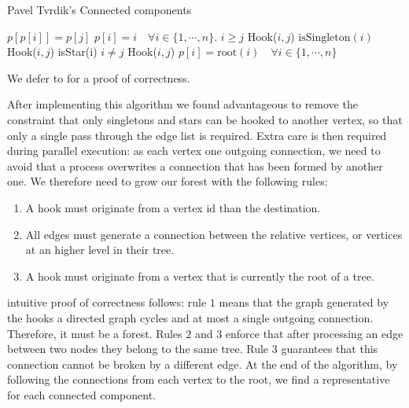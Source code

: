 \begin{algorithm}[H]
    \caption{Pavel Tvrdik's Connected components}
    \label{algorithm:cc1}
    \begin{algorithmic}[1]
          \State $p[p[i]] = p[j]$
        \EndProcedure
          \State $p[i] = i \quad \forall i \in \{1,\cdots, n\}$. 
         
          \State  \kif $i\ge j$ \kthen Hook($i, j$)
          \State  \kif $\text{isSingleton}(i)$ \kthen Hook($i, j$)
        \EndFor
         
          \State  \kif isStar(i) \kand $i \neq j$ \kthen Hook($i, j$)
        \EndFor
        \State $p[i] = \text{root}(i) \quad \forall i \in \{1,\cdots, n\}$ 
        \EndWhile
        \EndProcedure
   \end{algorithmic}
\end{algorithm}
We defer to \cite{PCompClass} for a proof of correctness.

After implementing this algorithm we found advantageous to remove the constraint
that only singletons and stars can be hooked to another vertex, so that only a single pass through
the edge list is required. Extra care is then required during parallel execution: as each vertex  one outgoing connection, we need to avoid that a process overwrites a connection that has been formed by another one.
We therefore need to grow our forest with the following rules:

\begin{enumerate}
    \item A hook must originate from a vertex id  than the destination.
    \item All edges must generate a connection between the relative vertices, or vertices at an higher level in their tree.
    \item A hook must originate from a vertex that is currently the root of a tree.
\end{enumerate}

 intuitive proof of correctness follows: rule $1$ means that the graph generated by the
hooks  a directed graph  cycles and  at most a single outgoing connection. Therefore, it must be a forest.
Rules $2$ and $3$ enforce that after processing an edge between two nodes they belong to the same tree. Rule $3$ guarantees that this connection cannot be broken by a different edge.
At the end of the algorithm, by following the connections from each vertex to the root, we  find a representative for each connected component.

